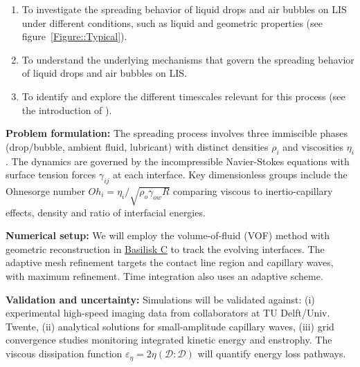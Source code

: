 \documentclass[11pt]{article}
\begin{document}
\begin{enumerate}
	\item To investigate the spreading behavior of liquid drops and air bubbles on LIS under different conditions, such as liquid and geometric properties (see figure~\ref{Figure::Typical}). 
	\item To understand the underlying mechanisms that govern the spreading behavior of liquid drops and air bubbles on LIS. 
	\item To identify and explore the different timescales relevant for this process (see the introduction of \citet{VatsalThesis}).
\end{enumerate}

\noindent \textbf{Problem formulation:} The spreading process involves three immiscible phases (drop/bubble, ambient fluid, lubricant) with distinct densities $\rho_i$ and viscosities $\eta_i$. The dynamics are governed by the incompressible Navier-Stokes equations with surface tension forces $\gamma_{ij}$ at each interface. Key dimensionless groups include the Ohnesorge number $Oh_i = \eta_i/\sqrt{\rho_o\gamma_{ow}R}$ comparing viscous to inertio-capillary effects, density and ratio of interfacial energies. 

\noindent \textbf{Numerical setup:} We will employ the volume-of-fluid (VOF) method with geometric reconstruction in \href{https://github.com/comphy-lab/Bubble-at-Lubis}{Basilisk C} to track the evolving interfaces. The adaptive mesh refinement targets the contact line region and capillary waves, with maximum refinement. Time integration also uses an adaptive scheme.

\noindent \textbf{Validation and uncertainty:} Simulations will be validated against: (i) experimental high-speed imaging data from collaborators at TU Delft/Univ. Twente, (ii) analytical solutions for small-amplitude capillary waves, (iii) grid convergence studies monitoring integrated kinetic energy and enstrophy. The viscous dissipation function $\varepsilon_\eta = 2\eta\left(\boldsymbol{\mathcal{D}:\mathcal{D}}\right)$ will quantify energy loss pathways.
\end{document}
